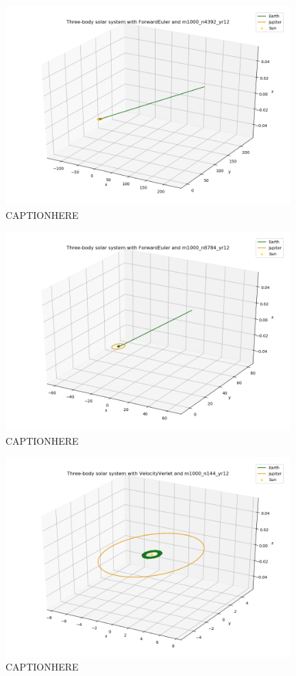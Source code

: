 \documentclass{article}
\begin{document}
    \begin{figure}[H]
        \centering
        \includegraphics[width = 11cm]{img/plot3D_S_E_J_F_m1000_n4392_yr12.png}
        \caption{CAPTIONHERE}
        \label{fig:plot3D_S_E_J_F_m1000_n4392_yr12}
    \end{figure}

    \begin{figure}[H]
        \centering
        \includegraphics[width = 11cm]{img/plot3D_S_E_J_F_m1000_n8784_yr12.png}
        \caption{CAPTIONHERE}
        \label{fig:plot3D_S_E_J_F_m1000_n8784_yr12}
    \end{figure}

    \begin{figure}[H]
        \centering
        \includegraphics[width = 11cm]{img/plot3D_S_E_J_V_m1000_n144_yr12.png}
        \caption{CAPTIONHERE}
        \label{fig:plot3D_S_E_J_V_m1000_n144_yr12}
    \end{figure}
\end{document}

